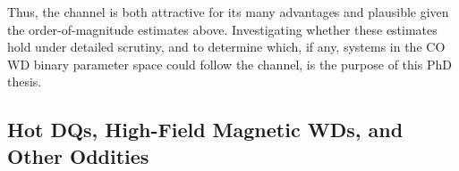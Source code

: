 Thus, the \citeal{vkercj10} channel is both attractive for its many advantages and plausible given the order-of-magnitude estimates above.  Investigating whether these estimates hold under detailed scrutiny, and to determine which, if any, systems in the CO WD binary parameter space could follow the channel, is the purpose of this PhD thesis.

\subsection{Hot DQs, High-Field Magnetic WDs, and Other Oddities}
